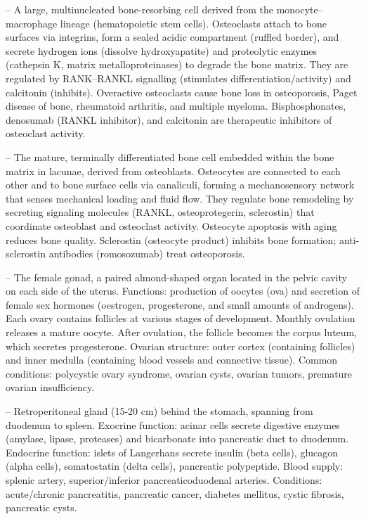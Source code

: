 -- A large, multinucleated bone-resorbing cell derived from the monocyte--macrophage lineage (hematopoietic stem cells). Osteoclasts attach to bone surfaces via integrins, form a sealed acidic compartment (ruffled border), and secrete hydrogen ions (dissolve hydroxyapatite) and proteolytic enzymes (cathepsin K, matrix metalloproteinases) to degrade the bone matrix. They are regulated by RANK--RANKL signalling (stimulates differentiation/activity) and calcitonin (inhibits). Overactive osteoclasts cause bone loss in osteoporosis, Paget disease of bone, rheumatoid arthritis, and multiple myeloma. Bisphosphonates, denosumab (RANKL inhibitor), and calcitonin are therapeutic inhibitors of osteoclast activity.

-- The mature, terminally differentiated bone cell embedded within the bone matrix in lacunae, derived from osteoblasts. Osteocytes are connected to each other and to bone surface cells via canaliculi, forming a mechanosensory network that senses mechanical loading and fluid flow. They regulate bone remodeling by secreting signaling molecules (RANKL, osteoprotegerin, sclerostin) that coordinate osteoblast and osteoclast activity. Osteocyte apoptosis with aging reduces bone quality. Sclerostin (osteocyte product) inhibits bone formation; anti-sclerostin antibodies (romosozumab) treat osteoporosis.

-- The female gonad, a paired almond-shaped organ located in the pelvic cavity on each side of the uterus. Functions: production of oocytes (ova) and secretion of female sex hormones (oestrogen, progesterone, and small amounts of androgens). Each ovary contains follicles at various stages of development. Monthly ovulation releases a mature oocyte. After ovulation, the follicle becomes the corpus luteum, which secretes progesterone. Ovarian structure: outer cortex (containing follicles) and inner medulla (containing blood vessels and connective tissue). Common conditions: polycystic ovary syndrome, ovarian cysts, ovarian tumors, premature ovarian insufficiency.

-- Retroperitoneal gland (15-20 cm) behind the stomach, spanning from duodenum to spleen. Exocrine function: acinar cells secrete digestive enzymes (amylase, lipase, proteases) and bicarbonate into pancreatic duct to duodenum. Endocrine function: islets of Langerhans secrete insulin (beta cells), glucagon (alpha cells), somatostatin (delta cells), pancreatic polypeptide. Blood supply: splenic artery, superior/inferior pancreaticoduodenal arteries. Conditions: acute/chronic pancreatitis, pancreatic cancer, diabetes mellitus, cystic fibrosis, pancreatic cysts.

